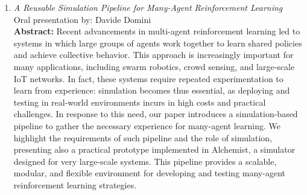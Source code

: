 \documentclass[runningheads]{llncs}
\begin{document}
\begin{enumerate}
    \item \emph{A Reusable Simulation Pipeline for Many-Agent Reinforcement Learning}~\cite{DBLP:conf/dsrt/DominiAPV24} \\ Oral presentation by: Davide Domini \\
    \textbf{Abstract: }
    Recent advancements in multi-agent reinforcement learning led to systems in which large groups of agents
     work together to learn shared policies and achieve collective behavior.
    This approach is increasingly important for many applications,
     including swarm robotics, crowd sensing, and large-scale IoT networks.
    In fact, these systems require repeated experimentation to learn from experience:
     simulation becomes thus essential, as deploying and testing in real-world environments incurs in high costs and practical challenges.
    In response to this need, our paper introduces a simulation-based pipeline to gather the necessary experience for many-agent learning.
    We highlight the requirements of such pipeline and the role of simulation, presenting also a practical prototype implemented in Alchemist,
     a simulator designed for very large-scale systems.
    This pipeline provides a scalable, modular, and flexible environment for developing and testing many-agent reinforcement learning strategies.
\end{enumerate}
\end{document}
